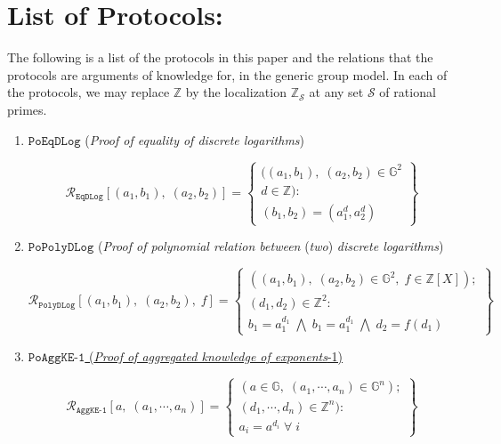 \documentclass[11pt, lettersize, notitlepage, leqno, footskip=0.6cm]{article}
\newcommand{\bz}{\mathbb Z}
\newcommand{\ttt}{\texttt}
\newcommand{\mc}{\mathcal}
\newcommand{\mb}{\mathbb}
\numberwithin{equation}{section}
\begin{document}
{{{\section{\fontsize{11}{11}\selectfont List of Protocols:}

\hypertarget{List}{The following is a list of the protocols in this paper and the relations that the protocols are arguments of knowledge for, in the generic group model. In each of the protocols, we may replace $\bz$ by the localization $\bz_{\mc{S}}$ at any set $\mc{S}$ of rational primes.}

\begin{enumerate}[wide, labelwidth=!, labelindent=0pt]

\item $\ttt{PoEqDLog}$ (\textit{Proof of equality of discrete logarithms}) \vspace{-0.3cm}

\[
  \mc{R}_{{\ttt{EqDLog}}}[(a_1, b_1),\;(a_2,b_2)] = \left\{\begin{array}{l}
    ((a_1, b_1), \; (a_2,b_2)\in\mb{G}^2\\
    d\in\mb{Z}): \\
    (b_1,b_2) = (a_1^d,a_2^d)
  \end{array}\right\}
\]

 

\item $\ttt{PoPolyDLog}$ (\textit{Proof of polynomial relation between} (\textit{two}) \textit{discrete logarithms})\vspace{-0.3cm}

\[
  \mc{R}_{{\ttt{PolyDLog}}}[(a_1, b_1),\;(a_2,b_2),\;f] = \left\{\begin{array}{l}
    ((a_1, b_1), \; (a_2,b_2)\in\mb{G}^2,\;f\in\bz[X]);\\
    (d_1, d_2)\in\mb{Z}^2: \\
    b_1 = a_1^{d_1}\; \bigwedge\; b_1 = a_1^{d_1}\; \bigwedge \;d_2 = f(d_1)
  \end{array}\right\}
\]

\item \hyperlink{AggKE-1}{$\ttt{PoAggKE-1}$ (\textit{Proof of aggregated knowledge of exponents}-1)} \vspace{-0.3cm}

\[
  \mc{R}_{{\ttt{AggKE-1}}}[a,\; (a_1,\cdots, a_n)] = \left\{\begin{array}{l}
    (a\in\mb{G},\; (a_1,\cdots, a_n)\in\mb{G}^n);\\ 
    (d_1,\cdots,d_n)\in\bz^n):  \\
    a_i = a^{d_i}\;\forall\; i
  \end{array}\right\}
\]



\end{enumerate}}}}
\end{document}
